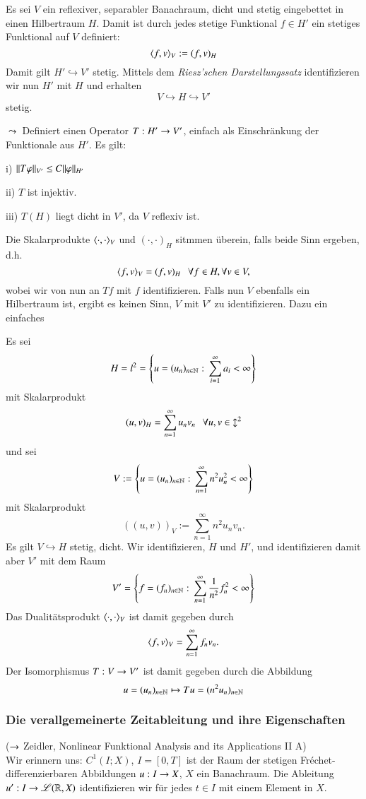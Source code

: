 Es sei $V$ ein reflexiver, separabler Banachraum, dicht und stetig eingebettet in einen Hilbertraum $H$.
Damit ist durch jedes stetige Funktional $f\in H'$ ein stetiges Funktional auf $V$ definiert:
\[
    \langle f,v \rangle _V := (f,v)_H
\]
Damit gilt $H'\hookrightarrow V'$ stetig. Mittels dem \textit{Riesz'schen Darstellungssatz} identifizieren wir nun
$H'$ mit $H$ und erhalten
\[
    V \hookrightarrow H \hookrightarrow V'
\]
stetig.

\noindent$\leadsto$ Definiert einen Operator $T:H'\rightarrow V'$, einfach als Einschränkung der Funktionale aus
$H'$. Es gilt:
\begin{description}
    \item{i)} $\|T\varphi\|_{V'}\leq C\|\varphi\|_{H'}$
    \item{ii)} $T$ ist injektiv.
    \item{iii)} $T(H)$ liegt dicht in $V'$, da $V$ reflexiv ist.
\end{description}
Die Skalarprodukte $\langle \cdot,\cdot \rangle_V$ und $(\cdot,\cdot)_H$ sitmmen überein, falls beide Sinn
ergeben, d.h.
\[
    \langle f,v\rangle_V=(f,v)_H \hspace{.25cm} \forall f\in H, \forall v\in V,
\]
wobei wir von nun an $Tf$ mit $f$ identifizieren. Falls nun $V$ ebenfalls ein Hilbertraum ist, ergibt es
keinen Sinn, $V$ mit $V'$ zu identifizieren. Dazu ein einfaches

\begin{beispiel}
    Es sei
    \[
        H=l^2= \left\{ u=(u_n)_{n\in\mathbb{N}} : \, \sum_{i=1}^\infty a_i<\infty\right\}
    \]
    mit Skalarprodukt
    \[
        (u,v)_H=\sum_{n=1}^\infty u_nv_n \hspace{.25cm} \forall u,v\in\mathcal l^2
    \]
    und sei
    \[
        V:=\left\{u=(u_n)_{n\in\mathbb{N}}:\, \sum_{n=1}^\infty n^2u_n^2<\infty\right\}
    \]
    mit Skalarprodukt
    \[
        ((u,v))_V:= \sum_{n=1}^\infty n^2u_nv_n.
    \]
    Es gilt $V\hookrightarrow H$ stetig, dicht. Wir identifizieren, $H$ und $H'$, und identifizieren
    damit aber $V'$ mit dem Raum 
    \[
        V'=\left\{ f=(f_n)_{n\in\mathbb{N}}: \, \sum_{n=1}^\infty \frac1{n^2} f_n^2 <\infty\right\}
    \]
    Das Dualitätsprodukt $\langle\cdot,\cdot\rangle_V$ ist damit gegeben durch
    \[
        \langle f,v\rangle_V=\sum_{n=1}^\infty f_nv_n.
    \]
    Der Isomorphismus $T:V\rightarrow V'$ ist damit gegeben durch die Abbildung
    \[
        u=(u_n)_{n\in\mathbb{N}}\mapsto Tu=(n^2u_n)_{n\in\mathbb{N}}
    \]
\end{beispiel}

\subsubsection*{Die verallgemeinerte Zeitableitung und ihre Eigenschaften}
($\rightarrow$ Zeidler, Nonlinear Funktional Analysis and its Applications II A)\\[.5cm]
\noindent Wir erinnern uns: $C^1(I;X)$, $I=[0,T]$ ist der Raum der stetigen Fréchet-differenzierbaren
Abbildungen $u:I\rightarrow X$, $X$ ein Banachraum. Die Ableitung $u': I\rightarrow \mathscr L(\mathbb{R},X)$ identifizieren wir für
jedes $t\in I$ mit einem Element in $X$.


